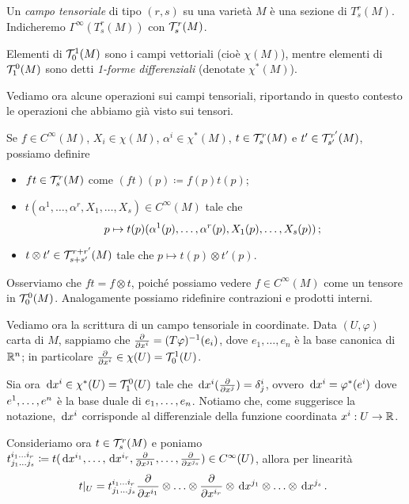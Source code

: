 \begin{definition} 
	Un \emph{campo tensoriale} di tipo $(r,s)$ su una varietà $M$ è una sezione di $T_s^r(M)$. Indicheremo $\Gamma^\infty(T_s^r(M))$ con $\Tau_s^r(M)$.
	
	Elementi di $\Tau_0^1(M)$ sono i campi vettoriali (cioè $\chi(M)$), mentre elementi di $\Tau_1^0(M)$ sono detti \emph{1-forme differenziali} (denotate $\chi^*(M)$). 
\end{definition}

Vediamo ora alcune operazioni sui campi tensoriali, riportando in questo contesto le operazioni che abbiamo già visto sui tensori. 

Se $f\in C^\infty(M)$, $X_i \in \chi(M)$, $\alpha^i \in \chi^*(M)$, $t \in \Tau_s^r(M)$ e $t' \in \Tau_{s'}^{r'}(M)$, possiamo definire
\begin{itemize}
	\item $ft \in \Tau_s^r(M)$ come $(ft)(p) \coloneqq f(p) t(p)$;
	\item $t(\alpha^1,\ldots,\alpha^r,X_1,\ldots, X_s)\in C^\infty(M)$ tale che
	\begin{equation*}
		p \mapsto t(p)(\alpha^1(p),\ldots,\alpha^r(p),X_1(p),\ldots, X_s(p)) \puntovirgola
	\end{equation*}
	
	\item $t\otimes t' \in \Tau_{s+s'}^{r+r'}(M)$ tale che $p \mapsto t(p)\otimes t'(p)$.
\end{itemize}
Osserviamo che $ft = f\otimes t$, poiché possiamo vedere $f\in C^\infty(M)$ come un tensore in $\Tau_0^0(M)$.
Analogamente possiamo ridefinire contrazioni e prodotti interni.

Vediamo ora la scrittura di un campo tensoriale in coordinate. Data $(U,\varphi)$ carta di $M$, sappiamo che $\DerParz{}{x^i} = (T\varphi)^{-1}(e_i)$, dove $e_1,\ldots, e_n$ è la base canonica di $\R^n$; in particolare $\DerParz{}{x^i} \in \chi(U)=\Tau_0^1(U)$. 

Sia ora $\de x^i\in \chi^*(U) = \Tau_1^0(U)$ tale che $\de x^i(\DerParz{}{x^j}) = \delta^i_j$, ovvero $\de x^i = \varphi^*(e^i)$ dove $\seqa en,$ è la base duale di $\seqb en,$.
Notiamo che, come suggerisce la notazione, $\de x^i$ corrisponde al differenziale della funzione coordinata $x^i:U\to \R$.


Consideriamo ora $t\in \Tau_s^r(M)$ e poniamo $t_{j_1\ldots j_s}^{i_1 \ldots i_r} \coloneqq t(\de x^{i_1}, \ldots, \de x^{i_r}, \DerParz{}{x^{j_1}}, \ldots, \DerParz{}{x^{j_s}}) \in C^\infty(U)$,
allora per linearità 
\begin{equation*}
	t\restrict U = t_{j_1\ldots j_s}^{i_1 \ldots i_r} \DerParz{}{x^{i_1}} \otimes \ldots \otimes \DerParz{}{x^{i_r}} \otimes \de x^{j_1}\otimes \ldots \otimes \de x^{j_s}\punto
\end{equation*}


